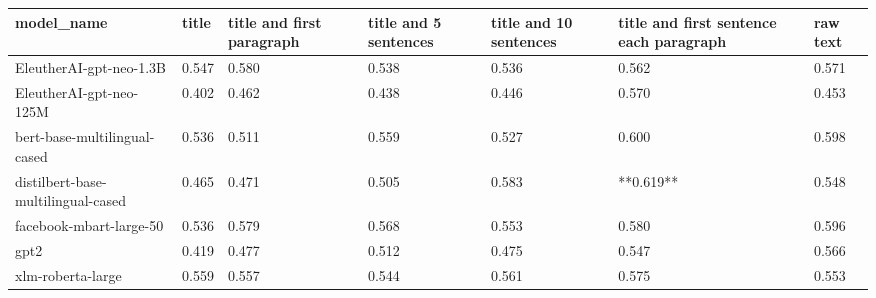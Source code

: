 \begin{tabular}{lllllll}
\toprule
                        model\_name & title & title and first paragraph & title and 5 sentences & title and 10 sentences & title and first sentence each paragraph & raw text \\
\midrule
           EleutherAI-gpt-neo-1.3B & 0.547 &                     0.580 &                 0.538 &                  0.536 &                                   0.562 &    0.571 \\
           EleutherAI-gpt-neo-125M & 0.402 &                     0.462 &                 0.438 &                  0.446 &                                   0.570 &    0.453 \\
      bert-base-multilingual-cased & 0.536 &                     0.511 &                 0.559 &                  0.527 &                                   0.600 &    0.598 \\
distilbert-base-multilingual-cased & 0.465 &                     0.471 &                 0.505 &                  0.583 &                               **0.619** &    0.548 \\
           facebook-mbart-large-50 & 0.536 &                     0.579 &                 0.568 &                  0.553 &                                   0.580 &    0.596 \\
                              gpt2 & 0.419 &                     0.477 &                 0.512 &                  0.475 &                                   0.547 &    0.566 \\
                 xlm-roberta-large & 0.559 &                     0.557 &                 0.544 &                  0.561 &                                   0.575 &    0.553 \\
\bottomrule
\end{tabular}
